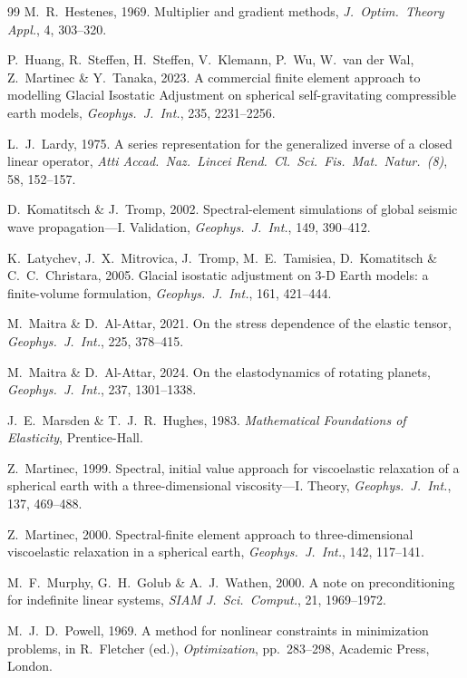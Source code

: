 \documentclass[11pt]{article}
\numberwithin{equation}{section}
\theoremstyle{remark}
\begin{document}
\begin{thebibliography}{99}
M.~R.~Hestenes, 1969.
Multiplier and gradient methods, \emph{J.\ Optim.\ Theory Appl.}, 4,
303--320.

P.~Huang, R.~Steffen, H.~Steffen, V.~Klemann, P.~Wu, W.~van der Wal,
Z.~Martinec \& Y.~Tanaka, 2023.
A commercial finite element approach to modelling Glacial Isostatic
Adjustment on spherical self-gravitating compressible earth models,
\emph{Geophys.\ J.\ Int.}, 235, 2231--2256.

L.~J.~Lardy, 1975.
A series representation for the generalized inverse of a closed linear
operator, \emph{Atti Accad.\ Naz.\ Lincei Rend.\ Cl.\ Sci.\ Fis.\ Mat.\
Natur.\ (8)}, 58, 152--157.

D.~Komatitsch \& J.~Tromp, 2002.
Spectral-element simulations of global seismic wave propagation---I.
Validation, \emph{Geophys.\ J.\ Int.}, 149, 390--412.

K.~Latychev, J.~X.~Mitrovica, J.~Tromp, M.~E.~Tamisiea, D.~Komatitsch \&
C.~C.~Christara, 2005.
Glacial isostatic adjustment on 3-D Earth models: a finite-volume
formulation, \emph{Geophys.\ J.\ Int.}, 161, 421--444.

M.~Maitra \& D.~Al-Attar, 2021.
On the stress dependence of the elastic tensor,
\emph{Geophys.\ J.\ Int.}, 225, 378--415.

M.~Maitra \& D.~Al-Attar, 2024.
On the elastodynamics of rotating planets,
\emph{Geophys.\ J.\ Int.}, 237, 1301--1338.

J.~E.~Marsden \& T.~J.~R.~Hughes, 1983.
\emph{Mathematical Foundations of Elasticity}, Prentice-Hall.

Z.~Martinec, 1999.
Spectral, initial value approach for viscoelastic relaxation of a
spherical earth with a three-dimensional viscosity---I. Theory,
\emph{Geophys.\ J.\ Int.}, 137, 469--488.

Z.~Martinec, 2000.
Spectral-finite element approach to three-dimensional viscoelastic
relaxation in a spherical earth, \emph{Geophys.\ J.\ Int.}, 142, 117--141.

M.~F.~Murphy, G.~H.~Golub \& A.~J.~Wathen, 2000.
A note on preconditioning for indefinite linear systems,
\emph{SIAM J.\ Sci.\ Comput.}, 21, 1969--1972.

M.~J.~D.~Powell, 1969.
A method for nonlinear constraints in minimization problems, in
R.~Fletcher (ed.), \emph{Optimization}, pp.~283--298, Academic Press,
London.


\end{thebibliography}
\end{document}
